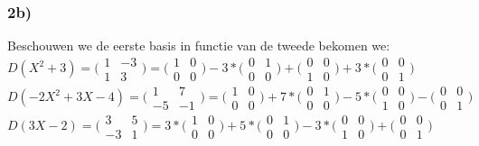 \documentclass[lineaire_algebra_oplossingen.tex]{subfiles}
\begin{document}
\subsubsection*{2b)}
Beschouwen we de eerste basis in functie van de tweede bekomen we:\\

$D(X^2+3) = \bigl(
\begin{smallmatrix}
1&-3\\ 1&3
\end{smallmatrix}
\bigr) = \bigl(
\begin{smallmatrix}
1&0\\ 0&0
\end{smallmatrix}
\bigr) -3* \bigl(
\begin{smallmatrix}
0&1\\ 0&0
\end{smallmatrix}
\bigr) + \bigl(
\begin{smallmatrix}
0&0\\ 1&0
\end{smallmatrix}
\bigr) +3* \bigl(
\begin{smallmatrix}
0&0\\ 0&1
\end{smallmatrix}
\bigr)$\\

$D(-2X^2+3X-4) = \bigl(
\begin{smallmatrix}
1&7\\ -5&-1
\end{smallmatrix}
\bigr) = \bigl(
\begin{smallmatrix}
1&0\\ 0&0
\end{smallmatrix}
\bigr) + 7* \bigl(
\begin{smallmatrix}
0&1\\ 0&0
\end{smallmatrix}
\bigr) - 5* \bigl(
\begin{smallmatrix}
0&0\\ 1&0
\end{smallmatrix}
\bigr) - \bigl(
\begin{smallmatrix}
0&0\\ 0&1
\end{smallmatrix}
\bigr)$\\

$D(3X-2) = \bigl(
\begin{smallmatrix}
3&5\\ -3&1
\end{smallmatrix}
\bigr) = 3* \bigl(
\begin{smallmatrix}
1&0\\ 0&0
\end{smallmatrix}
\bigr) + 5* \bigl(
\begin{smallmatrix}
0&1\\ 0&0
\end{smallmatrix}
\bigr) - 3* \bigl(
\begin{smallmatrix}
0&0\\ 1&0
\end{smallmatrix}
\bigr) + \bigl(
\begin{smallmatrix}
0&0\\ 0&1
\end{smallmatrix}
\bigr)$\\
\end{document}
